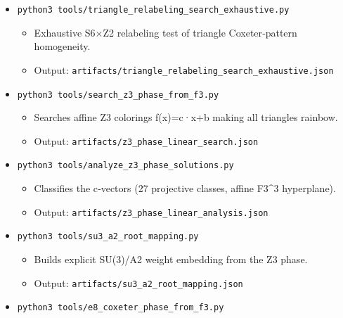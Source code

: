 \documentclass[11pt]{article}
\providecommand{\tightlist}{%
  \setlength{\itemsep}{0pt}\setlength{\parskip}{0pt}}
\begin{document}
\begin{itemize}
  \begin{itemize}
  \tightlist
  \item
    Triangle root‑content vectors across W(E6) orbits (72 +
    6\ensuremath{\times}27 + 6\ensuremath{\times}1).
  \item
    Output: \texttt{artifacts/a2\_triangles\_we6\_orbits.json}
  \end{itemize}
\item
  \texttt{python3\ tools/triangle\_relabeling\_search\_exhaustive.py}

  \begin{itemize}
  \tightlist
  \item
    Exhaustive S6\ensuremath{\times}Z2 relabeling test of triangle
    Coxeter‑pattern homogeneity.
  \item
    Output:
    \texttt{artifacts/triangle\_relabeling\_search\_exhaustive.json}
  \end{itemize}
\item
  \texttt{python3\ tools/search\_z3\_phase\_from\_f3.py}

  \begin{itemize}
  \tightlist
  \item
    Searches affine Z3 colorings f(x)=c·x+b making all triangles
    rainbow.
  \item
    Output: \texttt{artifacts/z3\_phase\_linear\_search.json}
  \end{itemize}
\item
  \texttt{python3\ tools/analyze\_z3\_phase\_solutions.py}

  \begin{itemize}
  \tightlist
  \item
    Classifies the c‑vectors (27 projective classes, affine F3\^{}3
    hyperplane).
  \item
    Output: \texttt{artifacts/z3\_phase\_linear\_analysis.json}
  \end{itemize}
\item
  \texttt{python3\ tools/su3\_a2\_root\_mapping.py}

  \begin{itemize}
  \tightlist
  \item
    Builds explicit SU(3)/A2 weight embedding from the Z3 phase.
  \item
    Output: \texttt{artifacts/su3\_a2\_root\_mapping.json}
  \end{itemize}
\item
  \texttt{python3\ tools/e8\_coxeter\_phase\_from\_f3.py}


\end{itemize}
\end{document}
